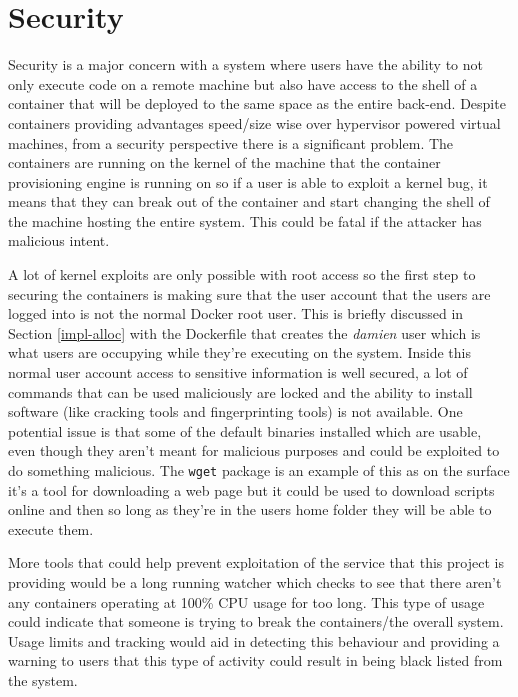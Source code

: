 \section{Security} \label{test-sec}


Security is a major concern with a system where users have the ability to not only execute code on a remote machine but also have access to the shell of a container that will be deployed to the same space as the entire back-end. Despite containers providing advantages speed/size wise over hypervisor powered virtual machines, from a security perspective there is a significant problem. The containers are running on the kernel of the machine that the container provisioning engine is running on so if a user is able to exploit a kernel bug, it means that they can break out of the container and start changing the shell of the machine hosting the entire system. This could be fatal if the attacker has malicious intent.

A lot of kernel exploits are only possible with root access so the first step to securing the containers is making sure that the user account that the users are logged into is not the normal Docker root user. This is briefly discussed in Section \ref{impl-alloc} with the Dockerfile that creates the \textit{damien} user which is what users are occupying while they're executing on the system. Inside this normal user account access to sensitive information is well secured, a lot of commands that can be used maliciously are locked and the ability to install software (like cracking tools and fingerprinting tools) is not available. One potential issue is that some of the default binaries installed which are usable, even though they aren't meant for malicious purposes and could be exploited to do something malicious. The \texttt{wget} package is an example of this as on the surface it's a tool for downloading a web page but it could be used to download scripts online and then so long as they're in the users home folder they will be able to execute them. 

More tools that could help prevent exploitation of the service that this project is providing would be a long running watcher which checks to see that there aren't any containers operating at 100\% CPU usage for too long. This type of usage could indicate that someone is trying to break the containers/the overall system. Usage limits and tracking would aid in detecting this behaviour and providing a warning to users that this type of activity could result in being black listed from the system.

\pagebreak
